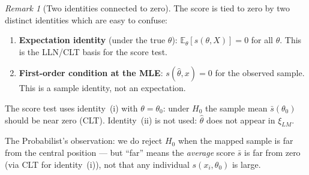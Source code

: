 \documentclass[a4paper,oneside,12pt]{extarticle}
\theoremstyle{plain}
\theoremstyle{definition}
\theoremstyle{remark}
\newtheorem{remark}[proposition]{Remark}
\begin{document}
\begin{remark}[Two identities connected to zero]
The score is tied to zero by two distinct identities which are easy
to confuse:
\begin{enumerate}[label=(\roman*)]
  \item \textbf{Expectation identity} (under the true $\theta$):
    $\mathbb{E}_\theta[s(\theta,X)] = 0$ for all $\theta$.
    This is the LLN/CLT basis for the score test.
  \item \textbf{First-order condition at the MLE}:
    $s(\hat\theta,x) = 0$ for the observed sample.
    This is a sample identity, not an expectation.
\end{enumerate}
The score test uses identity~(i) with $\theta=\theta_0$: under $H_0$
the sample mean $\bar{s}(\theta_0)$ should be near zero (CLT).
Identity~(ii) is not used: $\hat\theta$ does not appear in
$\xi_{LM}$.

The Probabilist's observation: we do reject $H_0$ when the mapped sample is
far from the central position --- but ``far'' means the
\emph{average} score $\bar{s}$ is far from zero (via CLT for
identity~(i)), not that any individual $s(x_i,\theta_0)$ is large.
\end{remark}

\end{document}
